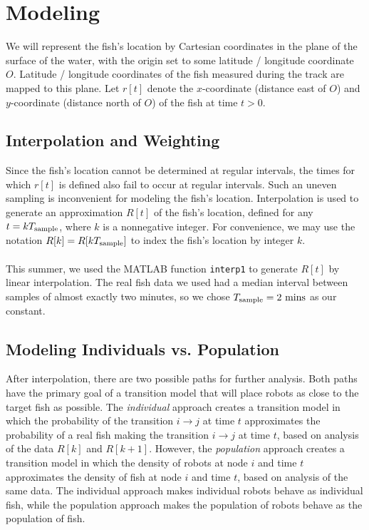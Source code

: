 \documentclass[11pt,letterpaper]{article}
\author{Kevin Smith}
\begin{document}
	
	\section{Modeling}
	
	We will represent the fish's location by Cartesian coordinates in the plane of the surface of the water, with the origin set to some latitude / longitude coordinate $O$. Latitude / longitude coordinates of the fish measured during the track are mapped to this plane. Let $r[t]$ denote the $x$-coordinate (distance east of $O$) and $y$-coordinate (distance north of $O$) of the fish at time $t > 0$.
	
	\subsection{Interpolation and Weighting}
	
	Since the fish's location cannot be determined at regular intervals, the times for which $r[t]$ is defined also fail to occur at regular intervals. Such an uneven sampling is inconvenient for modeling the fish's location. Interpolation is used to generate an approximation $R[t]$ of the fish's location, defined for any $t = kT_{\rm sample}$, where $k$ is a nonnegative integer. For convenience, we may use the notation $R[k] = R[k T_{\rm sample}]$ to index the fish's location by integer $k$.
	\\\\
	This summer, we used the MATLAB function \verb|interp1| to generate $R[t]$ by linear interpolation. The real fish data we used had a median interval between samples of almost exactly two minutes, so we chose $T_{\rm sample} = 2~\text{mins}$ as our constant.
	
	\subsection{Modeling Individuals vs. Population}
	
	After interpolation, there are two possible paths for further analysis. Both paths have the primary goal of a transition model that will place robots as close to the target fish as possible. The \textit{individual} approach creates a transition model in which the probability of the transition $i \rightarrow j$ at time $t$ approximates the probability of a real fish making the transition $i \rightarrow j$ at time $t$, based on analysis of the data $R[k]$ and $R[k + 1]$. However, the \textit{population} approach creates a transition model in which the density of robots at node $i$ and time $t$ approximates the density of fish at node $i$ and time $t$, based on analysis of the same data. The individual approach makes individual robots behave as individual fish, while the population approach makes the population of robots behave as the population of fish. 
	
\end{document}
